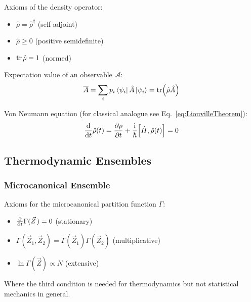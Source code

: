 			\noindent
			Axioms of the density operator:
			\begin{itemize}\itemsep -0pt	%
				\item $\hat{\rho} = \hat{\rho}^\dagger$ \hfill{(self-adjoint)}
				\item $\hat{\rho} \ge 0 $ \hfill{(positive semidefinite)}
				\item $\tr \hat{\rho} = 1$ \hfill{(normed)}
			\end{itemize}

			\noindent
			Expectation value of an observable $\mathcal{A}$:
			\begin{equation}
				\overline{A} = \sum_i p_i \Bra{\psi_i}\hat{A}\Ket{\psi_i} = \tr (\hat{\rho}\hat{A})
			\end{equation}

			\noindent
			Von Neumann equation (for classical analogue see Eq.~\ref{eq:LiouvilleTheorem}):
			\begin{equation}
				\label{eq:VonNeumannEquation}
				\dv{t}\hat{\rho}(t) = \pdv{\rho}{t} + \frac{\i}{\hbar} \comm{\hat{H}}{\hat{\rho}(t)} = 0
			\end{equation}

	\subsection{Thermodynamic Ensembles}
		\subsubsection{Microcanonical Ensemble}
			\noindent
			Axioms for the microcanonical partition function $\Gamma$:
			\begin{itemize}\itemsep -0pt	%
				\item $\pdv{t}\Gamma(\vec{Z}) = 0$ \hfill{(stationary)}
				\item $\Gamma(\vec{Z}_1,\vec{Z}_2) = \Gamma(\vec{Z}_1)\Gamma(\vec{Z}_2) $ \hfill{(multiplicative)}
				\item $\ln\Gamma(\vec{Z}) \propto N$ \hfill{(extensive)}
			\end{itemize}
			Where the third condition is needed for thermodynamics but not statistical mechanics in general.

